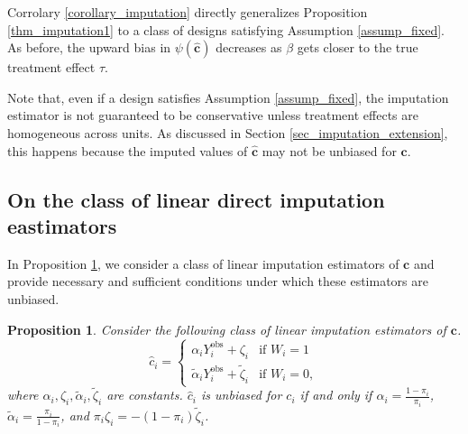 \documentclass[12pt]{article}
\newtheorem{proposition}[theorem]{Proposition}
\begin{document}
Corrolary \ref{corollary_imputation} directly generalizes Proposition \ref{thm_imputation1} to a class of designs satisfying Assumption \ref{assump_fixed}. As before, the upward bias in $\psi(\hat{\bm{c}})$ decreases as $\beta$ gets closer to the true treatment effect $\tau$.

Note that, even if a design satisfies Assumption \ref{assump_fixed}, the imputation estimator is not guaranteed to be conservative unless treatment effects are homogeneous across units. As discussed in Section \ref{sec_imputation_extension}, this happens because the imputed values of $\hat{\bm{c}}$ may not be unbiased for $\bm{c}$.


\subsection{On the class of linear direct imputation eastimators}

In Proposition \ref{prop_altimpute}, we consider a class of linear imputation estimators of $\bm{c}$ and provide necessary and sufficient conditions under which these estimators are unbiased. 

\begin{proposition} \normalfont
Consider the following class of linear imputation estimators of $\bm{c}$.
\begin{equation}
  \hat{c}_i =
    \begin{cases}
      \alpha_i Y^{\text{obs}}_i + \zeta_i & \text{if $W_i = 1$}\\
    \tilde{\alpha}_i Y^{\text{obs}}_i + \tilde{\zeta}_i & \text{if $W_i = 0$},
    \end{cases}       
\end{equation}
where $\alpha_i,\zeta_i,\tilde{\alpha}_i,\tilde{\zeta}_i$ are constants. $\hat{c}_i$ is unbiased for $c_i$ if and only if $\alpha_i = \frac{1-\pi_i}{\pi_i}$, $\tilde{\alpha}_i = \frac{\pi_i}{1-\pi_i}$, and $\pi_i\zeta_i = -(1-\pi_i)\tilde{\zeta}_i$.
\label{prop_altimpute}
\end{proposition}
\end{document}
